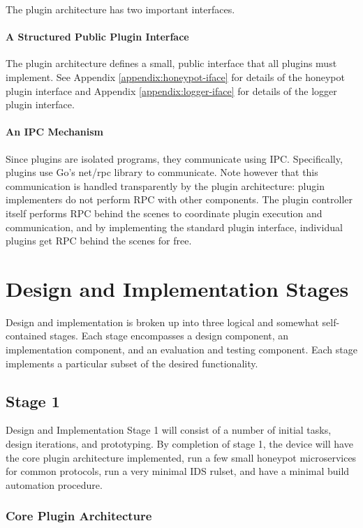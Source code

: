 The plugin architecture has two important interfaces.

\paragraph{A Structured Public Plugin Interface}
The plugin architecture defines a small, public interface that all plugins
must implement. See Appendix \ref{appendix:honeypot-iface} for details of the
honeypot plugin interface and Appendix \ref{appendix:logger-iface} for details
of the logger plugin interface.

\paragraph{An IPC Mechanism}
Since plugins are isolated programs, they communicate using IPC. Specifically,
plugins use Go's net/rpc library to communicate. Note however that this
communication is handled transparently by the plugin architecture:
plugin implementers do not perform RPC with other components. The
plugin controller itself performs RPC behind the scenes to coordinate
plugin execution and communication, and by implementing the standard
plugin interface, individual plugins get RPC behind the scenes for free.


\section{Design and Implementation Stages}

Design and implementation is broken up into three logical and somewhat
self-contained stages. Each stage encompasses a design component, an
implementation component, and an evaluation and testing component. Each stage
implements a particular subset of the desired functionality.

\subsection{Stage 1}

Design and Implementation Stage 1 will consist of a number of initial tasks,
design iterations, and prototyping. By completion of stage 1, the device
will have the core plugin architecture implemented, run a few small honeypot
microservices for common protocols, run a very minimal IDS rulset,
and have a minimal build automation procedure.

\subsubsection{Core Plugin Architecture}

